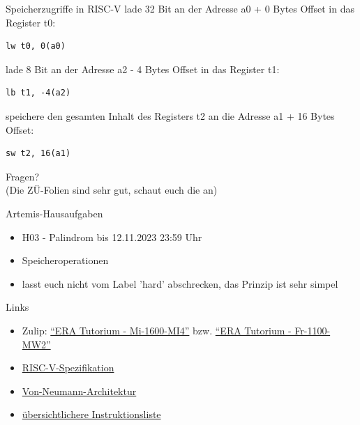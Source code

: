 \begin{frame}[fragile, c]{Speicherzugriffe in RISC-V}{}
	lade 32 Bit an der Adresse a0 + 0 Bytes Offset in das Register t0:
	\begin{verbatim}lw t0, 0(a0)\end{verbatim}
	lade 8 Bit an der Adresse a2 - 4 Bytes Offset in das Register t1:
	\begin{verbatim}lb t1, -4(a2)\end{verbatim}
	speichere den gesamten Inhalt des Registers t2 an die Adresse a1 + 16 Bytes Offset:
	\begin{verbatim}sw t2, 16(a1)\end{verbatim}
\end{frame}

\begin{frame}[c]{}{}
	\begin{center}
		\LARGE Fragen?\\
		\Large (Die ZÜ-Folien sind sehr gut, schaut euch die an)
	\end{center}
\end{frame}

\begin{frame}[c]{Artemis-Hausaufgaben}{}
	\begin{itemize}
		\item H03 - Palindrom bis 12.11.2023 23:59 Uhr
		\item Speicheroperationen
		\item lasst euch nicht vom Label 'hard' abschrecken, das Prinzip ist sehr simpel
	\end{itemize}
\end{frame}

\begin{frame}[fragile, c]{Links}{}
	\begin{itemize}
		\item Zulip: \href{https://zulip.in.tum.de/#narrow/stream/1917-ERA-Tutorium---Mi-1600-MI4}{\enquote{ERA Tutorium - Mi-1600-MI4}}
		      bzw. \href{https://zulip.in.tum.de/#narrow/stream/1940-ERA-Tutorium---Fr-1100-MW2}{\enquote{ERA Tutorium - Fr-1100-MW2}}
		\item \href{https://riscv.org/wp-content/uploads/2017/05/riscv-spec-v2.2.pdf}{RISC-V-Spezifikation}
		\item \href{https://www.geeksforgeeks.org/computer-organization-von-neumann-architecture/}{Von-Neumann-Architektur}
		\item \href{https://msyksphinz-self.github.io/riscv-isadoc/html/rvi.html}{übersichtlichere Instruktionsliste}
	\end{itemize}
\end{frame}

\maketitle


